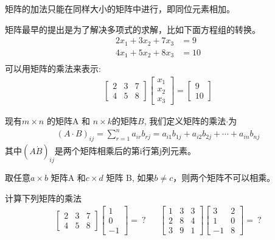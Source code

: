 \documentclass[12pt]{article}
\numberwithin{equation}{section}
\numberwithin{figure}{section}
\begin{document}
\begin{remark}
矩阵的加法只能在同样大小的矩阵中进行，即同位元素相加。	
\end{remark}

矩阵最早的提出是为了解决多项式的求解，比如下面方程组的转换。
\begin{align*}
	2x_1 + 3x_2 + 7x_3 & = 9 \\
	4x_1 + 5x_2 + 8 x_3 & = 10 \\
\end{align*}
可以用矩阵的乘法来表示:
\begin{align*}
	\begin{bmatrix}
		2 & 3 & 7 \\
		4 & 5 & 8 
	\end{bmatrix} \begin{bmatrix}
		x_1 \\
		x_2 \\
		x_3 
	\end{bmatrix} = \begin{bmatrix}
		 9 \\
		 10 
	\end{bmatrix}
\end{align*}

\begin{definition}
	现有$m \times n$ 的矩阵A 和 $n \times k$的矩阵$B$, 我们定义矩阵的乘法$\cdot$为
	\begin{align*}
		(A \cdot B)_{ij} = \sum_{r=1}^n a_{ir}b_{rj} = a_{i1}b_{1j} + a_{i2}b_{2j} + \cdots + a_{in}b_{nj}
	\end{align*}
	其中$(A \dot B)_{ij}$是两个矩阵相乘后的第i行第j列元素。
\end{definition}

\begin{remark}
取任意$a \times b$ 矩阵A 和$c \times d$ 矩阵 B, 如果$b \neq c$，则两个矩阵不可以相乘。	
\end{remark}

\begin{example}
计算下列矩阵的乘法
\begin{align*}
	\begin{bmatrix}
		2 & 3 & 7 \\
		4 & 5 & 8 
	\end{bmatrix} \begin{bmatrix}
		1 \\
		0 \\
		-1 
	\end{bmatrix} = \ ? & & \begin{bmatrix}
		1 & 3 & 3 \\
		2 & 8 & 4 \\
		3 & 9 & 1 
	\end{bmatrix} \begin{bmatrix}
		3 & 2 \\
		1 & 0 \\
		-1 & 8 
	\end{bmatrix} = \ ?
\end{align*}	
\end{example}
\end{document}

